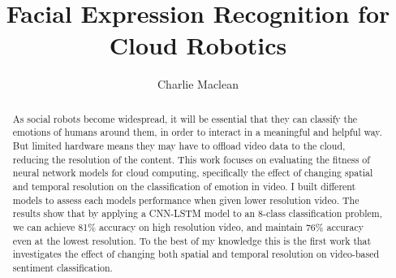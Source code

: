 \documentclass[sigconf]{acmart}
\begin{document}
\title{Facial Expression Recognition for Cloud Robotics}

\author{Charlie Maclean}


\renewcommand{\shortauthors}{Charlie Maclean}

\begin{abstract}

As social robots become widespread, it will be essential that they can
classify the emotions of humans around them, in order to interact in a
meaningful and helpful way. But limited hardware means they
may have to offload video data to the cloud, reducing the resolution of the
content. This work focuses on evaluating the fitness of neural network models
for cloud computing, specifically the effect of changing spatial and temporal 
resolution on the
classification of emotion in video. I built different models to assess each
models performance when given lower resolution video. The results show that by
applying a CNN-LSTM model to an 8-class classification problem, we can achieve 81\% accuracy on high resolution
video, and maintain 76\% accuracy even at the lowest resolution. To the best of
my knowledge this is the first work that investigates the effect of changing
both spatial and temporal resolution on video-based sentiment classification.

\end{abstract}



\maketitle
\end{document}

